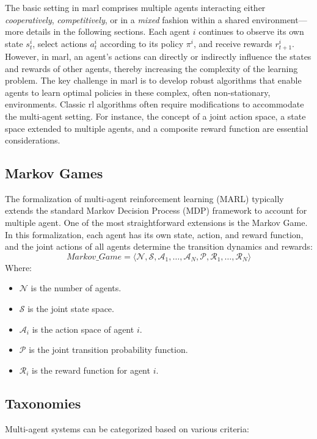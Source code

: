 The basic setting in \ac{marl} comprises multiple agents interacting either \emph{cooperatively}, \emph{competitively}, or in a \emph{mixed} fashion within a shared environment---more details in the following sections. 
 Each agent $i$ continues to observe its own state $s_{t}^{i}$, select actions $a_{t}^{i}$ according to its policy $\pi^{i}$, and receive rewards $r_{t+1}^{i}$.
 However, in \ac{marl}, 
 an agent's actions can directly or indirectly influence the states and rewards of other agents, 
 thereby increasing the complexity of the learning problem.
The key challenge in \ac{marl} is to develop robust algorithms that enable agents to learn optimal policies in these complex, often non-stationary, environments. Classic \ac{rl} algorithms often require modifications to accommodate the multi-agent setting. For instance, the concept of a joint action space, a state space extended to multiple agents, and a composite reward function are essential considerations.
\subsection{Markov Games}
The formalization of multi-agent reinforcement learning (MARL) typically extends the standard Markov Decision Process (MDP) framework to account for multiple agent. One of the most straightforward extensions is the Markov Game. 
 In this formalization, each agent has its own state, action, and reward function, and the joint actions of all agents determine the transition dynamics and rewards: 
\begin{equation}
Markov\_Game = \langle \mathcal{N}, \mathcal{S}, \mathcal{A}_1, \ldots, \mathcal{A}_N, \mathcal{P}, \mathcal{R}_1, \ldots, \mathcal{R}_N \rangle
\end{equation}
Where:
\begin{itemize}
    \item $\mathcal{N}$ is the number of agents.
    \item $\mathcal{S}$ is the joint state space.
    \item $\mathcal{A}_i$ is the action space of agent $i$.
    \item $\mathcal{P}$ is the joint transition probability function.
    \item $\mathcal{R}_i$ is the reward function for agent $i$.
\end{itemize}

\subsection{Taxonomies}
Multi-agent systems can be categorized based on various criteria:


